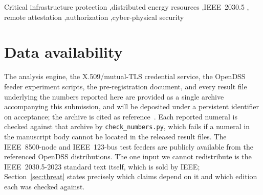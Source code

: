 \documentclass[review]{elsarticle}
\begin{document}
\begin{frontmatter}
\begin{abstract}
a reactive band that excludes zero absorption. Scope alone is still not sufficient
at the envelope operators actually grant, so lifetime is the second control:
across twenty paired seeds a compromise at the conformant envelope holds the feeder in violation
for the whole horizon under a long-lived credential, whereas under CONTAINDER the feeder returns
to its pre-attack baseline within one minute of expiry in $17$ of $20$ seeds under light load ---
though our fixed recovery threshold is too coarse to resolve the same question under normal load,
and we report that. We show that integrated harm is the product of a measured accrual rate and the
credential lifetime, so the containment factor is a lifetime the operator chooses rather than an
effect size we measured, and we report its cost: a $51.5\%$ rise in regulator tap operations. These are reduced-scale pilot
results, reported as exploratory; the pre-registered confirmatory sweep is future work.
\end{abstract}

\begin{keyword}
Critical infrastructure protection \sep distributed energy resources \sep IEEE~2030.5 \sep
remote attestation \sep authorization \sep cyber-physical security
\end{keyword}

\end{frontmatter}













\section*{Data availability}
The analysis engine, the X.509/mutual-TLS credential service, the OpenDSS feeder experiment
scripts, the pre-registration document, and every result file underlying the numbers reported here
are provided as a single archive accompanying this submission, and will be deposited under a
persistent identifier on acceptance; the archive is cited as
reference~\cite{dataset_containder}. Each reported numeral is checked against that archive by
\texttt{check\_numbers.py}, which fails if a numeral in the manuscript body cannot be located in
the released result files. The IEEE~8500-node and IEEE~123-bus test feeders are publicly
available from the referenced OpenDSS distributions. The one input we cannot redistribute is the
IEEE~2030.5-2023 standard text itself, which is sold by IEEE; Section~\ref{sec:threat} states
precisely which claims depend on it and which edition each was checked against.
\end{document}
